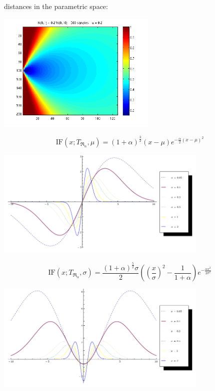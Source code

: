 \documentclass[11pt,a4paper]{beamer}
\begin{document}
\begin{frame}
	distances in the parametric space:
	\begin{center}
		\includegraphics[width = 3in]{vzdalenosti-02-500-02.png}			
	\end{center}
\end{frame}

\begin{frame}
	\begin{equation*}
		\mathrm{IF}(x;T_{\mathfrak{R}_\alpha},\mu) = (1+\alpha )^{\frac{3}{2}} (x-\mu ) e^{-\frac{\alpha}{2} (x-\mu )^2} 
	\end{equation*}
	\begin{center}
		\includegraphics[width = 4in]{IF-Normal-mu.png}			
	\end{center}
\end{frame}


\begin{frame}
	\begin{equation*}
		\mathrm{IF}(x;T_{\mathfrak{R}_\alpha},\sigma) = \frac{(1+\alpha)^\frac{5}{2}\sigma}{2} \left(\left(\frac{x}{\sigma} \right)^2 - \frac{1}{1+\alpha} \right) e^{ -\frac{\alpha x^2}{2\sigma^2}}
	\end{equation*}
	\begin{center}
		\includegraphics[width = 4in]{IF-Normal-sigma.png}			
	\end{center}
\end{frame}
\end{document}
